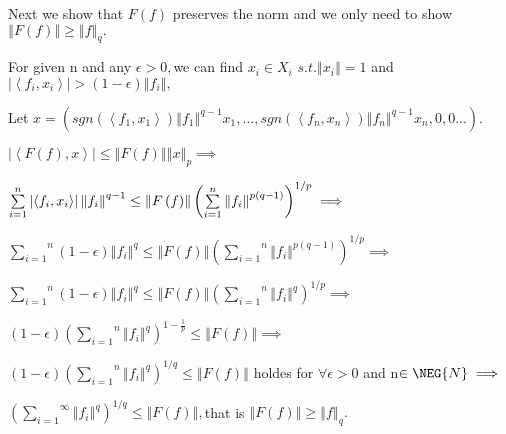 \documentclass{article}
\begin{document}
Next we show that $F\left( f\right) $ preserves the norm and we only need to
show $\left\Vert F\left( f\right) \right\Vert \geq \left\Vert f\right\Vert
_{q}.$

\bigskip For given n and any $\epsilon >0,$we can find $x_{i}\in X_{i}$ $%
s.t.\left\Vert x_{i}\right\Vert =1$ and $\left\vert \left\langle
f_{i},x_{i}\right\rangle \right\vert >\left( 1-\epsilon \right) \left\Vert
f_{i}\right\Vert ,$

Let $x=\left( sgn\left( \left\langle f_{1},x_{1}\right\rangle \right)
\left\Vert f_{1}\right\Vert ^{q-1}x_{1},...,sgn\left( \left\langle
f_{n},x_{n}\right\rangle \right) \left\Vert f_{n}\right\Vert
^{q-1}x_{n},0,0...\right) .$

$\left\vert \left\langle F\left( f\right) ,x\right\rangle \right\vert \leq
\left\Vert F\left( f\right) \right\Vert \left\Vert x\right\Vert _{p}\implies 
$

$\overset{n}{\underset{i=1}{\sum }}\left\vert \left\langle
f_{i},x_{i}\right\rangle \right\vert \left\Vert f_{i}\right\Vert ^{q-1}\leq
\left\Vert F\left( f\right) \right\Vert \left( \overset{n}{\underset{i=1}{%
\sum }}\left\Vert f_{i}\right\Vert ^{p\left( q-1\right) }\right)
^{1/p}\implies $

\bigskip $\overset{n}{\underset{i=1}{\sum }}\left( 1-\epsilon \right)
\left\Vert f_{i}\right\Vert ^{q}\leq \left\Vert F\left( f\right) \right\Vert
\left( \overset{n}{\underset{i=1}{\sum }}\left\Vert f_{i}\right\Vert
^{p\left( q-1\right) }\right) ^{1/p}\implies $

$\overset{n}{\underset{i=1}{\sum }}\left( 1-\epsilon \right) \left\Vert
f_{i}\right\Vert ^{q}\leq \left\Vert F\left( f\right) \right\Vert \left( 
\overset{n}{\underset{i=1}{\sum }}\left\Vert f_{i}\right\Vert ^{q}\right)
^{1/p}\implies $

$\left( 1-\epsilon \right) \left( \overset{n}{\underset{i=1}{\sum }}%
\left\Vert f_{i}\right\Vert ^{q}\right) ^{1-\frac{1}{p}}\leq \left\Vert
F\left( f\right) \right\Vert \implies $

$\left( 1-\epsilon \right) \left( \overset{n}{\underset{i=1}{\sum }}%
\left\Vert f_{i}\right\Vert ^{q}\right) ^{1/q}\leq \left\Vert F\left(
f\right) \right\Vert $ holdes for $\forall \epsilon >0$ and n$\in \NEG%
{N}\implies $

$\left( \overset{\infty }{\underset{i=1}{\sum }}\left\Vert f_{i}\right\Vert
^{q}\right) ^{1/q}\leq \left\Vert F\left( f\right) \right\Vert ,$that is $%
\left\Vert F\left( f\right) \right\Vert \geq \left\Vert f\right\Vert _{q}.$
\end{document}
